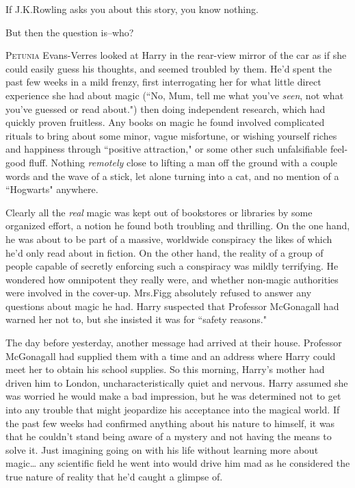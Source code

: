 
\begin{chapterOpeningAuthorNote}
If J.\?K.\?Rowling asks you about this story, you know nothing.
\end{chapterOpeningAuthorNote}
\begin{chapterOpeningQuote}
But then the question is\---who?
\end{chapterOpeningQuote}

\lettrine{P}{etunia} Evans-Verres looked at Harry in the rear-view mirror of the car as if she could easily guess his thoughts, and seemed troubled by them. He'd spent the past few weeks in a mild frenzy, first interrogating her for what little direct experience she had about magic (``No, Mum, tell me what you've \emph{seen}, not what you've guessed or read about.") then doing independent research, which had quickly proven fruitless. Any books on magic he found involved complicated rituals to bring about some minor, vague misfortune, or wishing yourself riches and happiness through ``positive attraction," or some other such unfalsifiable feel-good fluff. Nothing \emph{remotely} close to lifting a man off the ground with a couple words and the wave of a stick, let alone turning into a cat, and no mention of a ``Hogwarts" anywhere.

Clearly all the \emph{real} magic was kept out of bookstores or libraries by some organized effort, a notion he found both troubling and thrilling. On the one hand, he was about to be part of a massive, worldwide conspiracy the likes of which he'd only read about in fiction. On the other hand, the reality of a group of people capable of secretly enforcing such a conspiracy was mildly terrifying. He wondered how omnipotent they really were, and whether non-magic authorities were involved in the cover-up. Mrs.\?Figg absolutely refused to answer any questions about magic he had. Harry suspected that Professor McGonagall had warned her not to, but she insisted it was for ``safety reasons."

The day before yesterday, another message had arrived at their house. Professor McGonagall had supplied them with a time and an address where Harry could meet her to obtain his school supplies. So this morning, Harry's mother had driven him to London, uncharacteristically quiet and nervous. Harry assumed she was worried he would make a bad impression, but he was determined not to get into any trouble that might jeopardize his acceptance into the magical world. If the past few weeks had confirmed anything about his nature to himself, it was that he couldn't stand being aware of a mystery and not having the means to solve it. Just imagining going on with his life without learning more about magic{\ldots} any scientific field he went into would drive him mad as he considered the true nature of reality that he'd caught a glimpse of.

